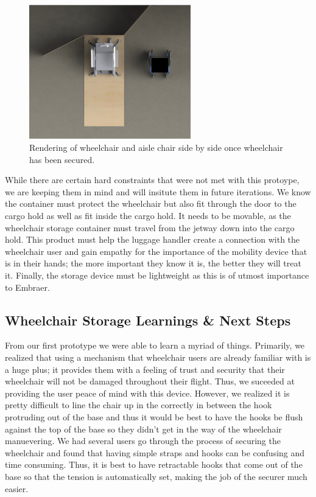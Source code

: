 \begin{figure}[h]
  \centering
     \includegraphics[width=7cm]{images/storagetransfer.png}
   \caption{Rendering of wheelchair and aisle chair side by side once wheelchair has been secured.}
  \label{fig:storagetransfer.png}
\end{figure}

While there are certain hard constraints that were not met with this protoype, we are keeping them in mind and will insitute them in future iterations. We know the container must protect the wheelchair but also fit through the door to the cargo hold as well as fit inside the cargo hold. It needs to be movable, as the wheelchair storage container must travel from the jetway down into the cargo hold. This product must help the luggage handler create a connection with the wheelchair user and gain empathy for the importance of the mobility device that is in their hands; the more important they know it is, the better they will treat it. Finally, the storage device must be lightweight as this is of utmost importance to Embraer.

\subsection{Wheelchair Storage Learnings \& Next Steps}

From our first prototype we were able to learn a myriad of things. Primarily, we realized that using a mechanism that wheelchair users are already familiar with is a huge plus; it provides them with a feeling of trust and security that their wheelchair will not be damaged throughout their flight. Thus, we suceeded at providing the user peace of mind with this device. However, we realized it is pretty difficult to line the chair up in the correctly in between the hook protruding out of the base and thus it would be best to have the hooks be flush against the top of the base so they didn't get in the way of the wheelchair manuevering.
We had several users go through the process of securing the wheelchair and found that having simple straps and hooks can be confusing and time consuming. Thus, it is best to have retractable hooks that come out of the base so that the tension is automatically set, making the job of the securer much easier. 

